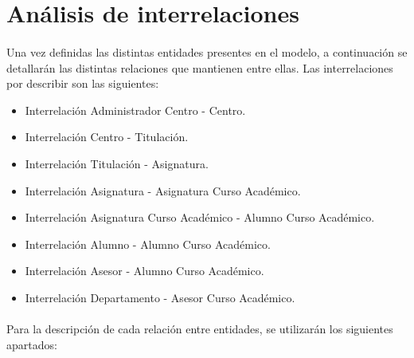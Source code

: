 \section{Análisis de interrelaciones}

   \paragraph{}Una vez definidas las distintas entidades presentes en el
   modelo, a continuación se detallarán las distintas relaciones que mantienen
   entre ellas. Las interrelaciones por describir son las siguientes:

   \begin{itemize}
    \item Interrelación Administrador Centro - Centro.
    \item Interrelación Centro - Titulación.
    \item Interrelación Titulación - Asignatura.
    \item Interrelación Asignatura - Asignatura Curso Académico.
    \item Interrelación Asignatura Curso Académico - Alumno Curso Académico.
    \item Interrelación Alumno - Alumno Curso Académico.
    \item Interrelación Asesor - Alumno Curso Académico.
    \item Interrelación Departamento - Asesor Curso Académico.
   \end{itemize}

   \paragraph{}Para la descripción de cada relación entre entidades, se
   utilizarán los siguientes apartados:

